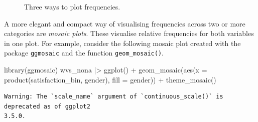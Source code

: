 \documentclass[
  letterpaper,
]{krantz}
\makeatletter
\newenvironment{Shaded}{\begin{snugshade}}{\end{snugshade}}
\newcommand{\AttributeTok}[1]{\textcolor[rgb]{0.40,0.45,0.13}{#1}}
\newcommand{\FunctionTok}[1]{\textcolor[rgb]{0.28,0.35,0.67}{#1}}
\newcommand{\NormalTok}[1]{\textcolor[rgb]{0.00,0.23,0.31}{#1}}
\newcommand{\SpecialCharTok}[1]{\textcolor[rgb]{0.37,0.37,0.37}{#1}}
\newenvironment{kframe}{%
\medskip{}
\setlength{\fboxsep}{.8em}
 \def\at@end@of@kframe{}%
 \ifinner\ifhmode%
  \def\at@end@of@kframe{\end{minipage}}%
  \begin{minipage}{\columnwidth}%
 \fi\fi%
 \def\FrameCommand##1{\hskip\@totalleftmargin \hskip-\fboxsep
 \colorbox{shadecolor}{##1}\hskip-\fboxsep
     \hskip-\linewidth \hskip-\@totalleftmargin \hskip\columnwidth}%
 \MakeFramed {\advance\hsize-\width
   \@totalleftmargin\z@ \linewidth\hsize
   \@setminipage}}%
 {\par\unskip\endMakeFramed%
 \at@end@of@kframe}
\renewenvironment{Shaded}{\begin{kframe}}{\end{kframe}}
\makeatother
\begin{document}
\begin{figure}[H]


\caption{\label{fig-three-plots-satisfaction-gender}Three ways to plot
frequencies.}

\end{figure}%

A more elegant and compact way of visualising frequencies across two or
more categories are \emph{mosaic plots}. These visualise relative
frequencies for both variables in one plot. For example, consider the
following mosaic plot created with the package \texttt{ggmosaic} and the
function \texttt{geom\_mosaic()}.

\begin{Shaded}
\begin{Highlighting}[]
\FunctionTok{library}\NormalTok{(ggmosaic)}
\NormalTok{wvs\_nona }\SpecialCharTok{|\textgreater{}}
  \FunctionTok{ggplot}\NormalTok{() }\SpecialCharTok{+}
  \FunctionTok{geom\_mosaic}\NormalTok{(}\FunctionTok{aes}\NormalTok{(}\AttributeTok{x =} \FunctionTok{product}\NormalTok{(satisfaction\_bin, gender),}
                            \AttributeTok{fill =}\NormalTok{ gender)) }\SpecialCharTok{+}
  \FunctionTok{theme\_mosaic}\NormalTok{()}
\end{Highlighting}
\end{Shaded}

\begin{verbatim}
Warning: The `scale_name` argument of `continuous_scale()` is deprecated as of ggplot2
3.5.0.
\end{verbatim}
\end{document}
